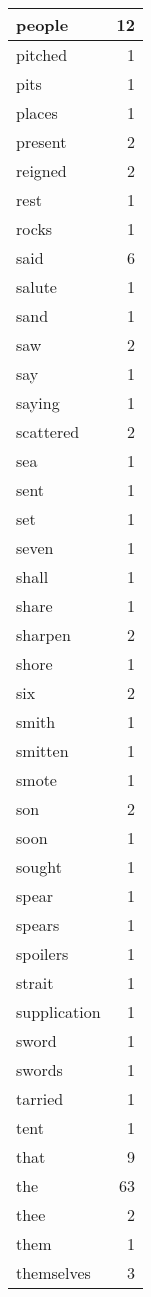 \begin{center}
\begin{longtable}{l|r}
people & 12 \\ \hline
pitched & 1 \\ \hline
pits & 1 \\ \hline
places & 1 \\ \hline
present & 2 \\ \hline
reigned & 2 \\ \hline
rest & 1 \\ \hline
rocks & 1 \\ \hline
said & 6 \\ \hline
salute & 1 \\ \hline
sand & 1 \\ \hline
saw & 2 \\ \hline
say & 1 \\ \hline
saying & 1 \\ \hline
scattered & 2 \\ \hline
sea & 1 \\ \hline
sent & 1 \\ \hline
set & 1 \\ \hline
seven & 1 \\ \hline
shall & 1 \\ \hline
share & 1 \\ \hline
sharpen & 2 \\ \hline
shore & 1 \\ \hline
six & 2 \\ \hline
smith & 1 \\ \hline
smitten & 1 \\ \hline
smote & 1 \\ \hline
son & 2 \\ \hline
soon & 1 \\ \hline
sought & 1 \\ \hline
spear & 1 \\ \hline
spears & 1 \\ \hline
spoilers & 1 \\ \hline
strait & 1 \\ \hline
supplication & 1 \\ \hline
sword & 1 \\ \hline
swords & 1 \\ \hline
tarried & 1 \\ \hline
tent & 1 \\ \hline
that & 9 \\ \hline
the & 63 \\ \hline
thee & 2 \\ \hline
them & 1 \\ \hline
themselves & 3 \\ \hline

\end{longtable}
\end{center}
